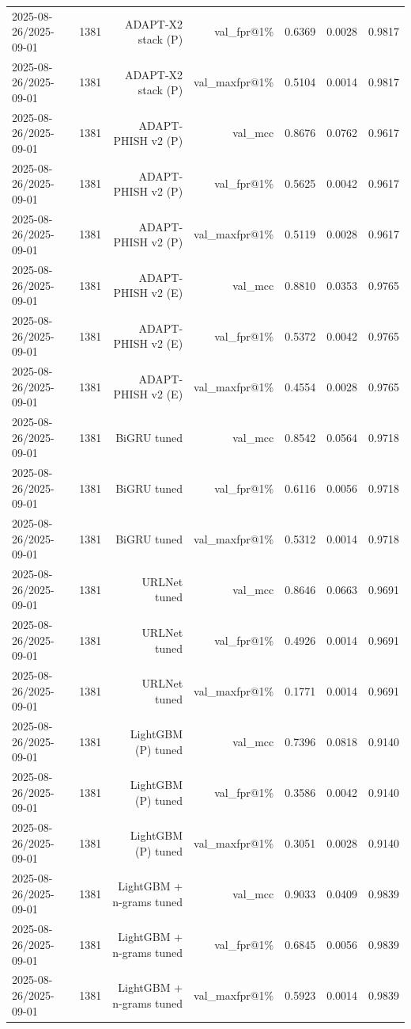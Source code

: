 \begin{table}[t]
\begin{tabular}{llrrrrr}
2025-08-26/2025-09-01 & 1381 & ADAPT-X2 stack (P) & val\_fpr@1\% & 0.6369 & 0.0028 & 0.9817 \\
2025-08-26/2025-09-01 & 1381 & ADAPT-X2 stack (P) & val\_maxfpr@1\% & 0.5104 & 0.0014 & 0.9817 \\
2025-08-26/2025-09-01 & 1381 & ADAPT-PHISH v2 (P) & val\_mcc & 0.8676 & 0.0762 & 0.9617 \\
2025-08-26/2025-09-01 & 1381 & ADAPT-PHISH v2 (P) & val\_fpr@1\% & 0.5625 & 0.0042 & 0.9617 \\
2025-08-26/2025-09-01 & 1381 & ADAPT-PHISH v2 (P) & val\_maxfpr@1\% & 0.5119 & 0.0028 & 0.9617 \\
2025-08-26/2025-09-01 & 1381 & ADAPT-PHISH v2 (E) & val\_mcc & 0.8810 & 0.0353 & 0.9765 \\
2025-08-26/2025-09-01 & 1381 & ADAPT-PHISH v2 (E) & val\_fpr@1\% & 0.5372 & 0.0042 & 0.9765 \\
2025-08-26/2025-09-01 & 1381 & ADAPT-PHISH v2 (E) & val\_maxfpr@1\% & 0.4554 & 0.0028 & 0.9765 \\
2025-08-26/2025-09-01 & 1381 & BiGRU tuned & val\_mcc & 0.8542 & 0.0564 & 0.9718 \\
2025-08-26/2025-09-01 & 1381 & BiGRU tuned & val\_fpr@1\% & 0.6116 & 0.0056 & 0.9718 \\
2025-08-26/2025-09-01 & 1381 & BiGRU tuned & val\_maxfpr@1\% & 0.5312 & 0.0014 & 0.9718 \\
2025-08-26/2025-09-01 & 1381 & URLNet tuned & val\_mcc & 0.8646 & 0.0663 & 0.9691 \\
2025-08-26/2025-09-01 & 1381 & URLNet tuned & val\_fpr@1\% & 0.4926 & 0.0014 & 0.9691 \\
2025-08-26/2025-09-01 & 1381 & URLNet tuned & val\_maxfpr@1\% & 0.1771 & 0.0014 & 0.9691 \\
2025-08-26/2025-09-01 & 1381 & LightGBM (P) tuned & val\_mcc & 0.7396 & 0.0818 & 0.9140 \\
2025-08-26/2025-09-01 & 1381 & LightGBM (P) tuned & val\_fpr@1\% & 0.3586 & 0.0042 & 0.9140 \\
2025-08-26/2025-09-01 & 1381 & LightGBM (P) tuned & val\_maxfpr@1\% & 0.3051 & 0.0028 & 0.9140 \\
2025-08-26/2025-09-01 & 1381 & LightGBM + n-grams tuned & val\_mcc & 0.9033 & 0.0409 & 0.9839 \\
2025-08-26/2025-09-01 & 1381 & LightGBM + n-grams tuned & val\_fpr@1\% & 0.6845 & 0.0056 & 0.9839 \\
2025-08-26/2025-09-01 & 1381 & LightGBM + n-grams tuned & val\_maxfpr@1\% & 0.5923 & 0.0014 & 0.9839 \\

\end{tabular}
\end{table}
